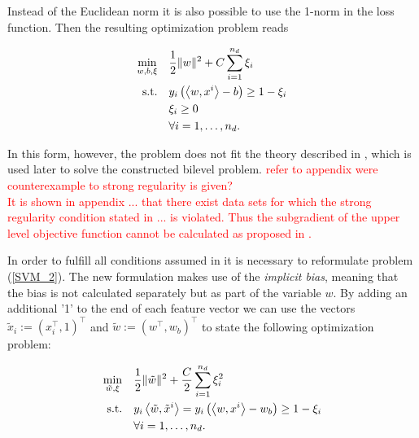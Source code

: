 Instead of the Euclidean norm it is also possible to use the 1-norm in the loss function. Then the resulting optimization problem reads

\begin{align*}
\begin{split}
	\min_{w,b,\xi} \quad & \frac{1}{2} \|w\|^2+C\sum_{i=1}^{n_d}{\xi_i} \\
	\text{s.t.} \quad & y_i\left(\left\langle w,x^i\right\rangle-b\right) \geq 1 - \xi_i \\
	& \xi_i \geq 0 \\
	& 	\forall i = 1, \dots , n_d.
\end{split}
\end{align*}

In this form, however, the problem does not fit the theory described in \cite{Outrata1998}, which is used later to solve the constructed bilevel problem. \textcolor{red}{refer to appendix were counterexample to strong regularity is given?\\
It is shown in appendix ... that there exist data sets for which the strong regularity condition stated in ... is violated. Thus the subgradient of the upper level objective function cannot be calculated as proposed in \cite{Outrata1998}.}


In order to fulfill all conditions assumed in \cite{Outrata1998} it is necessary to reformulate problem (\ref{SVM_2}).
The new formulation makes use of the \emph{implicit bias}, meaning that the bias is not calculated separately but as part of the variable \(w\). 
By adding an additional '1' to the end of each feature vector we can use the vectors \(\tilde{x}_i := (x_i^{\top},1)^{\top}\) and \(\tilde{w} := (w^{\top},w_b)^{\top}\) to state the following optimization problem:

\begin{align}
\begin{split}
	\min_{\tilde{w},\xi} \quad & \frac{1}{2} \|\tilde{w}\|^2+\frac{C}{2}\sum_{i=1}^{n_d}{\xi_i^2} \vspace{0.5ex}\\
	\text{s.t.} \quad & y_i\Langle \tilde{w},\tilde{x}^i\Rangle = y_i\left(\Langle w,x^i\Rangle-w_b\right) \geq 1 - \xi_i \vspace{0.5ex}\\
	& 	\forall i = 1, \dots , n_d.
\end{split}
\label{SVM_bias}
\end{align}

